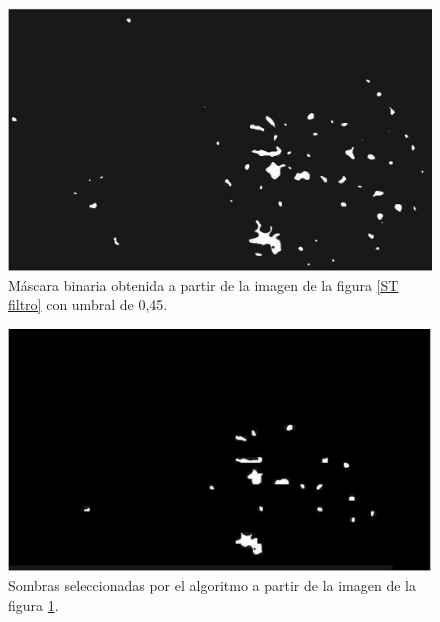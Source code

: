 \begin{figure}[h!]
    \includegraphics[width=\textwidth]{Imagenes/Homomorfico/ST2_bin.png}
     \hfill
     \caption{Máscara binaria obtenida a partir de la imagen de la figura \ref{ST filtro} con umbral de 0,45.}
    \label{mascaraST}
\end{figure}

\begin{figure}[h!]
    \includegraphics[width=\textwidth]{Imagenes/Homomorfico/ST2_masked.png}
     \hfill
     \caption{Sombras seleccionadas por el algoritmo a partir de la imagen de la figura \ref{mascaraST}.}
    \label{seleccionadaST}
\end{figure}

